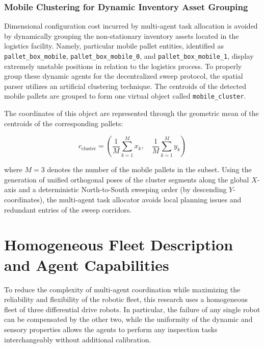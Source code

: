 \subsubsection{Mobile Clustering for Dynamic Inventory Asset Grouping}\label{sec:ch4_mobile_cluster}

Dimensional configuration cost incurred by multi-agent task allocation is avoided by dynamically grouping the non-stationary inventory assets located in the logistics facility. Namely, particular mobile pallet entities, identified as \texttt{pallet\_box\_mobile}, \texttt{pallet\_box\-\_mobile\_0}, and \texttt{pallet\_box\_mobile\_1}, display extremely unstable positions in relation to the logistics process. To properly group these dynamic agents for the decentralized sweep protocol, the spatial parser utilizes an artificial clustering technique. The centroids of the detected mobile pallets are grouped to form one virtual object called \texttt{mobile\_cluster}.

The coordinates of this object are represented through the geometric mean of the centroids of the corresponding pallets:

\begin{equation}
c_{\text{cluster}} = \left( \frac{1}{M} \sum_{k=1}^{M} x_k, \quad \frac{1}{M} \sum_{k=1}^{M} y_k \right)
\end{equation}

where $M = 3$ denotes the number of the mobile pallets in the subset. Using the generation of unified orthogonal poses of the cluster segments along the global $X$-axis and a deterministic North-to-South sweeping order (by descending $Y$-coordinates), the multi-agent task allocator avoids local planning issues and redundant entries of the sweep corridors.



\section{Homogeneous Fleet Description and Agent Capabilities}

To reduce the complexity of multi-agent coordination while maximizing the reliability and flexibility of the robotic fleet, this research uses a homogeneous fleet of three differential drive robots. In particular, the failure of any single robot can be compensated by the other two, while the uniformity of the dynamic and sensory properties allows the agents to perform any inspection tasks interchangeably without additional calibration.

